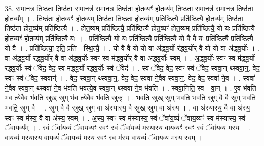 \documentclass[17pt]{extarticle}
\begin{document}
38. स॒मा॒नत्र॒ तिष्ठ॑ता॒ तिष्ठ॑ता समा॒नत्र॑ समा॒नत्र॒ तिष्ठ॑ता होत॒व्यꣳ॑ होत॒व्य॑म् तिष्ठ॑ता समा॒नत्र॑ समा॒नत्र॒ तिष्ठ॑ता होत॒व्य᳚म् । . तिष्ठ॑ता होत॒व्यꣳ॑ होत॒व्य॑म् तिष्ठ॑ता॒ तिष्ठ॑ता होत॒व्य॑म् प्रति॑ष्ठित्यै॒ प्रति॑ष्ठित्यै होत॒व्य॑म् तिष्ठ॑ता॒ तिष्ठ॑ता होत॒व्य॑म् प्रति॑ष्ठित्यै । . हो॒त॒व्य॑म् प्रति॑ष्ठित्यै॒ प्रति॑ष्ठित्यै होत॒व्यꣳ॑ होत॒व्य॑म् प्रति॑ष्ठित्यै॒ यो यः प्रति॑ष्ठित्यै होत॒व्यꣳ॑ होत॒व्य॑म् प्रति॑ष्ठित्यै॒ यः । . प्रति॑ष्ठित्यै॒ यो यः प्रति॑ष्ठित्यै॒ प्रति॑ष्ठित्यै॒ यो वै वै यः प्रति॑ष्ठित्यै॒ प्रति॑ष्ठित्यै॒ यो वै । . प्रति॑ष्ठित्या॒ इति॒ प्रति॑ - स्थि॒त्यै॒ । . यो वै वै यो यो वा अ॑द्ध्व॒र्यो र॑द्ध्व॒र्योर् वै यो यो वा अ॑द्ध्व॒र्योः । . वा अ॑द्ध्व॒र्यो र॑द्ध्व॒र्योर् वै वा अ॑द्ध्व॒र्योः स्वꣳ स्व म॑द्ध्व॒र्योर् वै वा अ॑द्ध्व॒र्योः स्वम् । . अ॒द्ध्व॒र्योः स्वꣳ स्व म॑द्ध्व॒र्यो र॑द्ध्व॒र्योः स्वं ॅवेद॒ वेद॒ स्व म॑द्ध्व॒र्यो र॑द्ध्व॒र्योः स्वं ॅवेद॑ । . स्वं ॅवेद॒ वेद॒ स्वꣳ स्वं ॅवेद॒ स्ववा॒न् थ्स्ववा॒न्॒. वेद॒ स्वꣳ स्वं ॅवेद॒ स्ववान्॑ । . वेद॒ स्ववा॒न् थ्स्ववा॒न्॒. वेद॒ वेद॒ स्ववा॑ ने॒वैव स्ववा॒न्॒. वेद॒ वेद॒ स्ववा॑ ने॒व । . स्ववा॑ ने॒वैव स्ववा॒न् थ्स्ववा॑ ने॒व भ॑वति भवत्ये॒व स्ववा॒न् थ्स्ववा॑ ने॒व भ॑वति । . स्ववा॒निति॒ स्व - वा॒न् । . ए॒व भ॑वति भव त्ये॒वैव भ॑वति॒ स्रुख् स्रुग् भ॑व त्ये॒वैव भ॑वति॒ स्रुक् । . भ॒व॒ति॒ स्रुख् स्रुग् भ॑वति भवति॒ स्रुग् वै वै स्रुग् भ॑वति भवति॒ स्रुग् वै । . स्रुग् वै वै स्रुख् स्रुग् वा अ॑स्यास्य॒ वै स्रुख् स्रुग् वा अ॑स्य । . वा अ॑स्यास्य॒ वै वा अ॑स्य॒ स्वꣳ स्व म॑स्य॒ वै वा अ॑स्य॒ स्वम् । . अ॒स्य॒ स्वꣳ स्व म॑स्यास्य॒ स्वं ॅवा॑य॒व्यं॑ ॅवाय॒व्यꣳ॑ स्व म॑स्यास्य॒ स्वं ॅवा॑य॒व्य᳚म् । . स्वं ॅवा॑य॒व्यं॑ ॅवाय॒व्यꣳ॑ स्वꣳ स्वं ॅवा॑य॒व्य॑ मस्यास्य वाय॒व्यꣳ॑ स्वꣳ स्वं ॅवा॑य॒व्य॑ मस्य । . वा॒य॒व्य॑ मस्यास्य वाय॒व्यं॑ ॅवाय॒व्य॑ मस्य॒ स्वꣳ स्व म॑स्य वाय॒व्यं॑ ॅवाय॒व्य॑ मस्य॒ स्वम् । \newline
\end{document}
